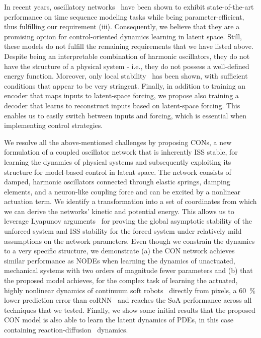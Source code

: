 In recent years, oscillatory networks~\cite{rusch2020coupled, rusch2021unicornn, ceni2024random, lanthaler2024neural, rusch2024oscillatory} have been shown to exhibit state-of-the-art performance on time sequence modeling tasks while being parameter-efficient, thus fulfilling our requirement (iii).
%
Consequently, we believe that they are a promising option for control-oriented dynamics learning in latent space.
%
Still, these models do not fulfill the remaining requirements that we have listed above. %
%
Despite being an interpretable combination of harmonic oscillators, they do not have the structure of a physical system - i.e., they do not possess a well-defined energy function.
%
Moreover, only local stability~\cite{rusch2020coupled, ceni2024random} has been shown, with sufficient conditions that appear to be very stringent. %
%
Finally, in addition to training an encoder that maps inputs to latent-space forcing, we propose also training a decoder that learns to reconstruct inputs based on latent-space forcing. This enables us to easily switch between inputs and forcing, which is essential when implementing control strategies.

We resolve all the above-mentioned challenges by proposing \glspl{CON}, a new formulation of a coupled oscillator network that is inherently \gls{ISS} stable, for learning the dynamics of physical systems and subsequently exploiting its structure for model-based control in latent space.
The network consists of damped, harmonic oscillators connected through elastic springs, damping elements, and a neuron-like coupling force and can be excited by a nonlinear actuation term.
We identify a transformation into a set of coordinates from which we can derive the networks' kinetic and potential energy.
This allows us to leverage Lyapunov arguments~\cite{khalil2002nonlinear} for proving the global asymptotic stability of the unforced system and \gls{ISS} stability for the forced system under relatively mild assumptions on the network parameters.
Even though we constrain the dynamics to a very specific structure, we demonstrate (a) the CON network achieves similar performance as \glspl{NODE} when learning the dynamics of unactuated, mechanical systems with two orders of magnitude fewer parameters and (b) that the proposed model achieves, for the complex task of learning the actuated, highly nonlinear dynamics of continuum soft robots~\cite{alora2023data, stolzle2021piston} directly from pixels, a \SI{60}{\percent} lower prediction error than \gls{coRNN}~\cite{rusch2020coupled} and reaches the SoA performance across all techniques that we tested.
Finally, we show some initial results that the proposed \gls{CON} model is also able to learn the latent dynamics of \glspl{PDE}, in this case containing reaction-diffusion~\cite{champion2019data, epstein2016reaction} dynamics.

